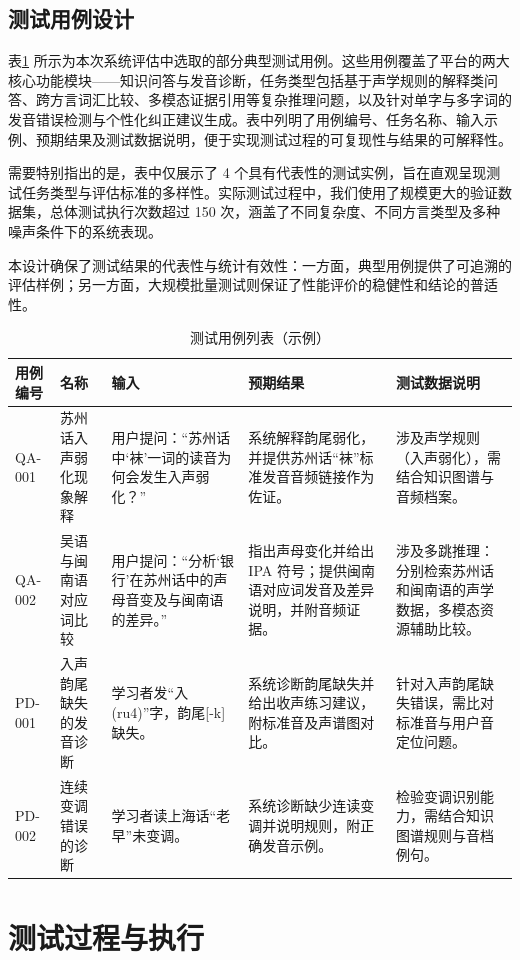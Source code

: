 \section{测试用例设计}
表\ref{tab:test-cases} 所示为本次系统评估中选取的部分典型测试用例。这些用例覆盖了平台的两大核心功能模块——知识问答与发音诊断，任务类型包括基于声学规则的解释类问答、跨方言词汇比较、多模态证据引用等复杂推理问题，以及针对单字与多字词的发音错误检测与个性化纠正建议生成。表中列明了用例编号、任务名称、输入示例、预期结果及测试数据说明，便于实现测试过程的可复现性与结果的可解释性。

需要特别指出的是，表中仅展示了 4 个具有代表性的测试实例，旨在直观呈现测试任务类型与评估标准的多样性。实际测试过程中，我们使用了规模更大的验证数据集，总体测试执行次数超过 150 次，涵盖了不同复杂度、不同方言类型及多种噪声条件下的系统表现。

本设计确保了测试结果的代表性与统计有效性：一方面，典型用例提供了可追溯的评估样例；另一方面，大规模批量测试则保证了性能评价的稳健性和结论的普适性。
\begin{table}[H]
\centering
\caption{测试用例列表（示例）}
\label{tab:test-cases}
\begin{tabularx}{\textwidth}{p{1.8cm} p{2.2cm} p{3cm} X X}
\toprule
\textbf{用例编号} & \textbf{名称} & \textbf{输入} & \textbf{预期结果} & \textbf{测试数据说明} \\
\midrule
QA-001 & 苏州话入声弱化现象解释 & 用户提问：“苏州话中‘袜’一词的读音为何会发生入声弱化？” & 系统解释韵尾弱化，并提供苏州话“袜”标准发音音频链接作为佐证。 & 涉及声学规则（入声弱化），需结合知识图谱与音频档案。 \\
\midrule
QA-002 & 吴语与闽南语对应词比较 & 用户提问：“分析‘银行’在苏州话中的声母音变及与闽南语的差异。” & 指出声母变化并给出 IPA 符号；提供闽南语对应词发音及差异说明，并附音频证据。 & 涉及多跳推理：分别检索苏州话和闽南语的声学数据，多模态资源辅助比较。 \\
\midrule
PD-001 & 入声韵尾缺失的发音诊断 & 学习者发“入(ru4)”字，韵尾[-k]缺失。 & 系统诊断韵尾缺失并给出收声练习建议，附标准音及声谱图对比。 & 针对入声韵尾缺失错误，需比对标准音与用户音定位问题。 \\
\midrule
PD-002 & 连续变调错误的诊断 & 学习者读上海话“老早”未变调。 & 系统诊断缺少连读变调并说明规则，附正确发音示例。 & 检验变调识别能力，需结合知识图谱规则与音档例句。 \\
\bottomrule
\end{tabularx}
\end{table}
\chapter{测试过程与执行}
